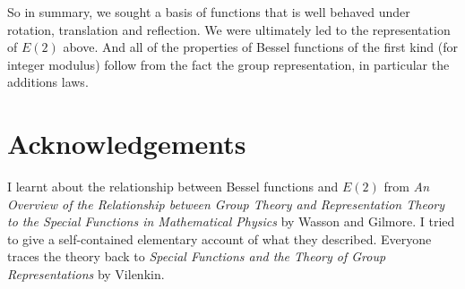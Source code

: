 \documentclass{article}
\begin{document}
So in summary, we sought a basis of functions that is well behaved under rotation, translation and reflection.
We were ultimately led to the representation of $E(2)$ above.
And all of the properties of Bessel functions of the first kind (for integer modulus) follow from the fact the group representation, in particular the additions laws.

\section{Acknowledgements}
I learnt about the relationship between Bessel functions and $E(2)$ from \textit{An Overview of the Relationship between Group Theory and Representation Theory to the Special Functions in Mathematical Physics} by Wasson and Gilmore.
I tried to give a self-contained elementary account of what they described.
Everyone traces the theory back to \textit{Special Functions and the Theory of Group Representations} by Vilenkin.
\end{document}
